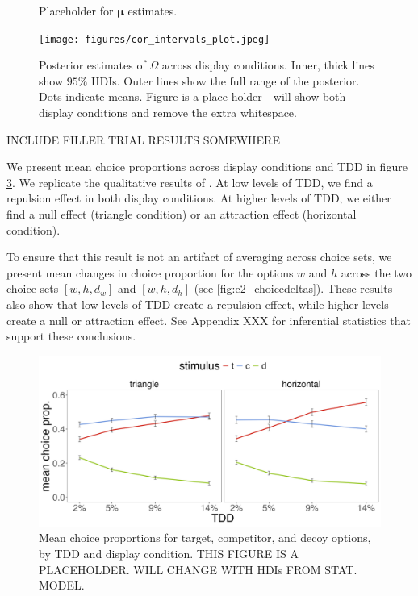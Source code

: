 \documentclass{umassthesis}          %
\begin{document}
\begin{figure}
   \caption{Placeholder for $\mathbf{\mu}$ estimates.}
   \label{fig:e2mu}
\end{figure}

\begin{figure}
   \texttt{[image: figures/cor\_intervals\_plot.jpeg]}
   \caption{Posterior estimates of $\Omega$ across display conditions. Inner, thick lines show $95\%$ HDIs. Outer lines show the full range of the posterior. Dots indicate means. Figure is a place holder - will show both display conditions and remove the extra whitespace.}
   \label{fig:omega}
\end{figure}

INCLUDE FILLER TRIAL RESULTS SOMEWHERE


We present mean choice proportions across display conditions and TDD in figure \ref{fig:e2_choiceprops}. We replicate the qualitative results of \textcite{spektorWhenGoodLooks2018b}. At low levels of TDD, we find a repulsion effect in both display conditions. At higher levels of TDD, we either find a null effect (triangle condition) or an attraction effect (horizontal condition). 

To ensure that this result is not an artifact of averaging across choice sets, we present mean changes in choice proportion for the options $w$ and $h$ across the two choice sets $[w,h,d_{w}]$ and $[w,h,d_{h}]$ (see \ref{fig:e2_choicedeltas}). These results also show that low levels of TDD create a repulsion effect, while higher levels create a null or attraction effect. See Appendix XXX for inferential statistics that support these conclusions.

\begin{figure}
   \includegraphics[width=\textwidth]{figures/choicePhase_att_trials_mean_choice_props_collapsed.jpg}
   \caption{Mean choice proportions for target, competitor, and decoy options, by TDD and display condition. THIS FIGURE IS A PLACEHOLDER. WILL CHANGE WITH HDIs FROM STAT. MODEL.}
   \label{fig:e2_choiceprops}
\end{figure}
\end{document}
